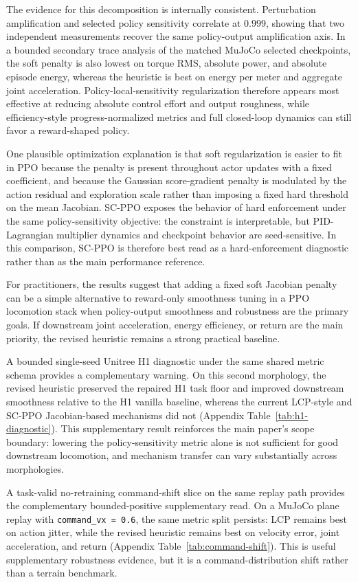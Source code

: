 \documentclass[10pt]{article}
\begin{document}
The evidence for this decomposition is internally consistent. Perturbation
amplification and selected policy sensitivity correlate at $0.999$, showing
that two independent measurements recover the same policy-output amplification
axis. In a bounded secondary trace analysis of the matched MuJoCo selected
checkpoints, the soft penalty is also lowest on torque RMS, absolute power, and
absolute episode energy, whereas the heuristic is best on energy per meter and
aggregate joint acceleration. Policy-local-sensitivity regularization therefore
appears most effective at reducing absolute control effort and output
roughness, while efficiency-style progress-normalized metrics and full
closed-loop dynamics can still favor a reward-shaped policy.

One plausible optimization explanation is that soft regularization is easier to
fit in PPO because the penalty is present throughout actor updates with a fixed
coefficient, and because the Gaussian score-gradient penalty is modulated by
the action residual and exploration scale rather than imposing a fixed hard
threshold on the mean Jacobian. SC-PPO exposes the behavior of hard
enforcement under the same policy-sensitivity objective: the constraint is
interpretable, but PID-Lagrangian multiplier dynamics and checkpoint behavior
are seed-sensitive. In this comparison, SC-PPO is therefore best read as a
hard-enforcement diagnostic rather than as the main performance reference.

For practitioners, the results suggest that adding a fixed soft Jacobian
penalty can be a simple alternative to reward-only smoothness tuning in a PPO
locomotion stack when policy-output smoothness and robustness are the primary
goals. If downstream joint acceleration, energy efficiency, or return are the
main priority, the revised heuristic remains a strong practical baseline.

A bounded single-seed Unitree H1 diagnostic under the same shared metric schema
provides a complementary warning. On this second morphology, the revised
heuristic preserved the repaired H1 task floor and improved downstream
smoothness relative to the H1 vanilla baseline, whereas the current LCP-style
and SC-PPO Jacobian-based mechanisms did not (Appendix
Table~\ref{tab:h1-diagnostic}). This supplementary result reinforces the main
paper's scope boundary: lowering the policy-sensitivity metric alone is not
sufficient for good downstream locomotion, and mechanism transfer can vary
substantially across morphologies.

A task-valid no-retraining command-shift slice on the same replay path provides
the complementary bounded-positive supplementary read. On a MuJoCo plane replay
with \texttt{command\_vx = 0.6}, the same metric split persists: LCP remains
best on action jitter, while the revised heuristic remains best on velocity
error, joint acceleration, and return (Appendix
Table~\ref{tab:command-shift}). This is useful supplementary robustness
evidence, but it is a command-distribution shift rather than a terrain
benchmark.
\end{document}
